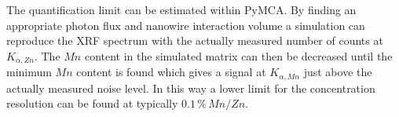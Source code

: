 The quantification limit can be estimated within PyMCA. By finding an appropriate photon flux and nanowire interaction volume a simulation can reproduce the XRF spectrum with the actually measured number of counts at $K_{\alpha,Zn}$. The $Mn$ content in the simulated matrix can then be decreased until the minimum $Mn$ content is found which gives a signal at $K_{\alpha,Mn}$ just above the actually measured noise level. In this way a lower limit for the concentration resolution can be found at typically $0.1\,\%\,Mn/Zn$.



